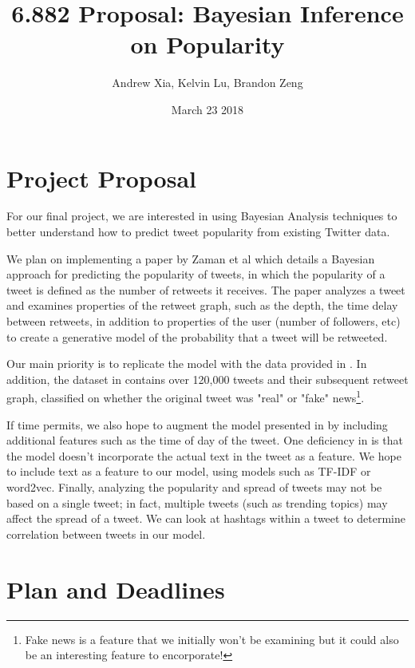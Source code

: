 \documentclass[runningheads]{article}
\title{6.882 Proposal: Bayesian Inference on Popularity}
\author{Andrew Xia, Kelvin Lu, Brandon Zeng}
\date{March 23 2018}
\begin{document}
\maketitle

\section{Project Proposal}

For our final project, we are interested in using Bayesian Analysis techniques to better understand how to predict tweet popularity from existing Twitter data. 

We plan on implementing a paper by Zaman et al \cite{popularity} which details a Bayesian approach for predicting the popularity of tweets, in which the popularity of a tweet is defined as the number of retweets it receives. The paper analyzes a tweet and examines properties of the retweet graph, such as the depth, the time delay between retweets, in addition to properties of the user (number of followers, etc) to create a generative model of the probability that a tweet will be retweeted. 

Our main priority is to replicate the model with the data provided in \cite{popularity}. In addition, the dataset in \cite{medialab} contains over 120,000 tweets and their subsequent retweet graph, classified on whether the original tweet was "real" or "fake" news\footnote{Fake news is a feature that we initially won't be examining but it could also be an interesting feature to encorporate!}.


If time permits, we also hope to augment the model presented in \cite{popularity} by including additional features such as the time of day of the tweet. One deficiency in \cite{popularity} is that the model doesn't incorporate the actual text in the tweet as a feature. We hope to include text as a feature to our model, using models such as TF-IDF or word2vec. Finally, analyzing the popularity and spread of tweets may not be based on a single tweet; in fact, multiple tweets (such as trending topics) may affect the spread of a tweet. We can look at hashtags within a tweet to determine correlation between tweets in our model.

\section{Plan and Deadlines}

\end{document}
